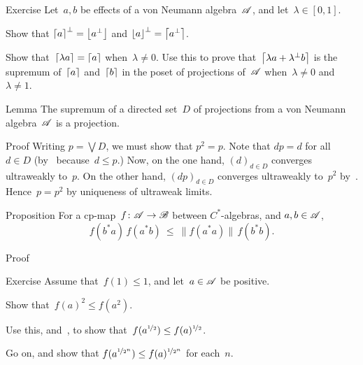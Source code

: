 \documentclass[main]{subfiles}
\begin{document}
%
%
%
\begin{parsec}%
\begin{point}{Exercise}%
Let~$a,b$ be effects of a von Neumann algebra~$\mathscr{A}$,
and let~$\lambda\in [0,1]$.
\begin{point}%
Show that $\left\lceil a\right\rceil^\perp = \left\lfloor a^\perp\right\rfloor$
and $\left\lfloor a\right\rfloor^\perp = \left\lceil a^\perp\right\rceil$.
\end{point}
\begin{point}%
Show that~$\left\lceil\lambda a\right\rceil = \left\lceil a\right\rceil$
when~$\lambda\neq 0$.
Use this to prove that~$\left\lceil\lambda a+\lambda^\perp b\right\rceil$
is the supremum of~$\left\lceil a\right\rceil$ and~$\left\lceil b\right\rceil$
in the poset of projections of~$\mathscr{A}$
when~$\lambda\neq 0$ and~$\lambda\neq 1$.
\end{point}
\end{point}
\end{parsec}

%
%
\begin{parsec}%
\begin{point}{Lemma}%
The supremum of a directed set~$D$ of projections
from a von Neumann algebra~$\mathscr{A}$ is a projection.
\end{point}
\begin{point}{Proof}%
Writing $p=\bigvee D$,
we must show that $p^2=p$.
Note that $dp=d$ for all~$d\in D$
(by~ because~$d\leq p$.)
Now, on the one hand, $(d)_{d\in D}$
converges ultraweakly to~$p$.
On the other hand,
$(dp)_{d\in D}$
converges ultraweakly to~$p^2$ by~.
Hence~$p=p^2$ by uniqueness of ultraweak limits.
\end{point}
\end{parsec}

\begin{parsec}%
\begin{point}{Proposition}%
For a cp-map~$f\colon \mathscr{A}\to\mathscr{B}$
 between $C^*$-algebras, and $a,b\in\mathscr{A}$, 
\begin{equation*}
f(b^*a)\,f(a^*b)\ \leq\ \|f(a^*a)\|\,f(b^*b).
\end{equation*}
\end{point}%
\begin{point}{Proof}%
\end{point}
\end{parsec}
%
%
%
\begin{parsec}%
\begin{point}{Exercise}%
Assume that~$f(1)\leq 1$,
and let~$a\in \mathscr{A}$ be positive.
\begin{point}%
Show that~$f(a)^2 \leq f(a^2)$.
\end{point}
\begin{point}%
Use this, and~,
to show that~$f(a^{\nicefrac{1}{2}}) \leq f(a)^{\nicefrac{1}{2}}$.
\end{point}
\begin{point}%
Go on, and show that $f(a^{\nicefrac{1}{2^n}})
\leq f(a)^{\nicefrac{1}{2^n}}$ for each~$n$.
\end{point}
\end{point}
\end{parsec}
\end{document}
